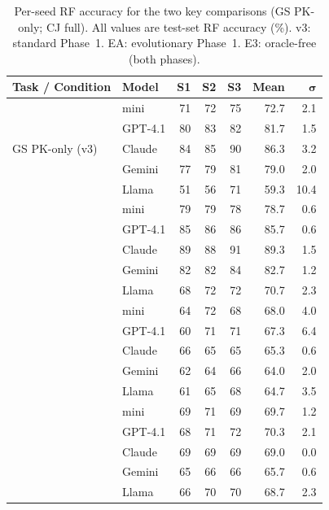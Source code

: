 \documentclass{article}
\begin{document}
\begin{table}[h]
  \caption{Per-seed RF accuracy for the two key comparisons (GS PK-only; CJ full).
    All values are test-set RF accuracy (\%).
    v3: standard Phase~1. EA: evolutionary Phase~1. E3: oracle-free (both phases).}
  \label{tab:seed_detail}
  \centering
  \smallskip
  \begin{tabular}{llrrrrr}
    \toprule
    \textbf{Task / Condition} & \textbf{Model} & \textbf{S1} & \textbf{S2} & \textbf{S3}
      & \textbf{Mean} & $\boldsymbol{\sigma}$ \\
    \midrule
    \multirow{5}{*}{GS PK-only (v3)}
      & mini      & 71 & 72 & 75 & 72.7 & 2.1 \\
      & GPT-4.1   & 80 & 83 & 82 & 81.7 & 1.5 \\
      & Claude    & 84 & 85 & 90 & 86.3 & 3.2 \\
      & Gemini    & 77 & 79 & 81 & 79.0 & 2.0 \\
      & Llama     & 51 & 56 & 71 & 59.3 & 10.4 \\
    \addlinespace
    \multirow{5}{*}{GS PK-only (EA)}
      & mini      & 79 & 79 & 78 & 78.7 & 0.6 \\
      & GPT-4.1   & 85 & 86 & 86 & 85.7 & 0.6 \\
      & Claude    & 89 & 88 & 91 & 89.3 & 1.5 \\
      & Gemini    & 82 & 82 & 84 & 82.7 & 1.2 \\
      & Llama     & 68 & 72 & 72 & 70.7 & 2.3 \\
    \addlinespace
    \multirow{5}{*}{CJ full (v3)}
      & mini      & 64 & 72 & 68 & 68.0 & 4.0 \\
      & GPT-4.1   & 60 & 71 & 71 & 67.3 & 6.4 \\
      & Claude    & 66 & 65 & 65 & 65.3 & 0.6 \\
      & Gemini    & 62 & 64 & 66 & 64.0 & 2.0 \\
      & Llama     & 61 & 65 & 68 & 64.7 & 3.5 \\
    \addlinespace
    \multirow{5}{*}{CJ full (E3, no oracle)}
      & mini      & 69 & 71 & 69 & 69.7 & 1.2 \\
      & GPT-4.1   & 68 & 71 & 72 & 70.3 & 2.1 \\
      & Claude    & 69 & 69 & 69 & 69.0 & 0.0 \\
      & Gemini    & 65 & 66 & 66 & 65.7 & 0.6 \\
      & Llama     & 66 & 70 & 70 & 68.7 & 2.3 \\
    \bottomrule
  \end{tabular}
\end{table}
\end{document}
